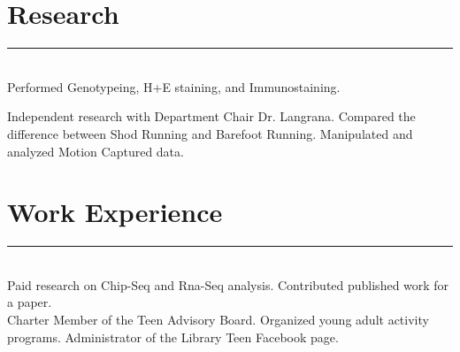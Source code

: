 \documentclass[letterpaper]{deedy-resume} %
\begin{document}
\sectionspace %



\section{Research}
\hrule \leavevmode \\
\vspace{2 mm}
\hfill
{}
\hfill
{}
\vspace{1 mm}
Performed Genotypeing, H+E staining, and Immunostaining.	
\sectionspace %
\vspace{2 mm}

\hfill
{}
\hfill
{}
\vspace{1 mm}
 Independent research with Department Chair Dr. Langrana. Compared the difference between Shod Running and Barefoot Running. Manipulated and analyzed Motion Captured data. 


\sectionspace %

\section{Work Experience}
\hrule \leavevmode \\
\vspace{2 mm}
\hfill
{}
\hfill
{}
\vspace{1 mm}
Paid research on Chip-Seq and Rna-Seq analysis. Contributed published work for a paper.\\	
\sectionspace %
\vspace{2 mm}
\hfill
{}
\hfill
{}
\vspace{1 mm}
Charter Member of the Teen Advisory Board. Organized young adult activity programs. Administrator of the Library Teen Facebook page. 
\end{document}
